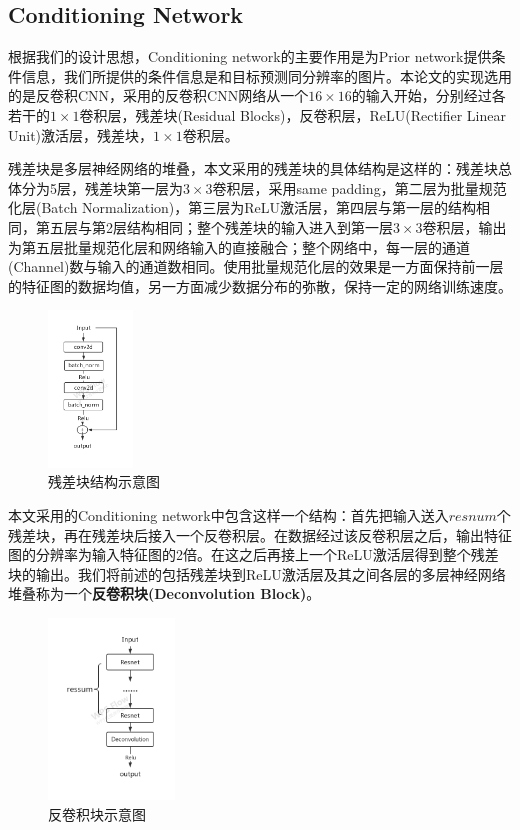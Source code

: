 \subsection{Conditioning Network}

根据我们的设计思想，Conditioning network的主要作用是为Prior network提供条件信息，我们所提供的条件信息是和目标预测同分辨率的图片。本论文的实现选用的是反卷积CNN，采用的反卷积CNN网络从一个$16\times 16$的输入开始，分别经过各若干的$1\times 1$卷积层，残差块(Residual Blocks)，反卷积层，ReLU(Rectifier Linear Unit)激活层，残差块，$1\times 1$卷积层。

残差块是多层神经网络的堆叠，本文采用的残差块的具体结构是这样的：残差块总体分为5层，残差块第一层为$3\times 3$卷积层，采用same padding，第二层为批量规范化层(Batch Normalization)，第三层为ReLU激活层，第四层与第一层的结构相同，第五层与第2层结构相同；整个残差块的输入进入到第一层$3\times 3$卷积层，输出为第五层批量规范化层和网络输入的直接融合；整个网络中，每一层的通道(Channel)数与输入的通道数相同。使用批量规范化层的效果是一方面保持前一层的特征图的数据均值，另一方面减少数据分布的弥散，保持一定的网络训练速度。

\begin{figure}[htp]
    \centering
    \includegraphics[width=0.2\textwidth]{figures/resnet}
    \caption{残差块结构示意图}
\end{figure}

本文采用的Conditioning network中包含这样一个结构：首先把输入送入$resnum$个残差块，再在残差块后接入一个反卷积层。在数据经过该反卷积层之后，输出特征图的分辨率为输入特征图的2倍。在这之后再接上一个ReLU激活层得到整个残差块的输出。我们将前述的包括残差块到ReLU激活层及其之间各层的多层神经网络堆叠称为一个\textbf{反卷积块(Deconvolution Block)}。

\begin{figure}[htp]
    \centering
    \includegraphics[width=0.3\textwidth]{figures/Deconvolution}
    \caption{反卷积块示意图}
\end{figure}

